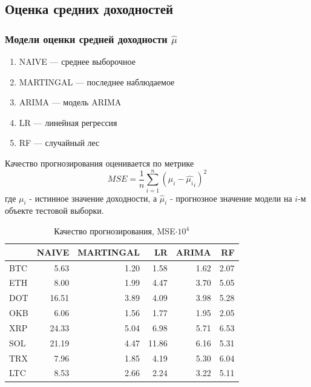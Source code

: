 \documentclass{beamer}
\begin{document}
\subsection{Оценка средних доходностей}

\begin{frame}
    \frametitle{Модели оценки средней доходности $\hat{\mu}$}
    \begin{enumerate}
        \item NAIVE --- среднее выборочное
        \item MARTINGAL --- последнее наблюдаемое
        \item ARIMA --- модель ARIMA
        \item LR --- линейная регрессия
        \item RF --- случайный лес
    \end{enumerate}

    Качество прогнозирования оценивается по метрике 
    \[
	MSE = \frac{1}{n} \sum_{i=1}^{n} (\mu_i - \hat{\mu_i}_i)^2
    \]
    где $\mu_i$ - истинное значение доходности,
    а $\hat{\mu}_i$ - прогнозное значение модели на $i$-м объекте тестовой выборки.
\end{frame}

\begin{frame}
    \begin{table}[h]
    \caption{Качество прогнозирования, MSE$\cdot 10^4$}
        \label{tab:ml_eval_metrics}
        \begin{tabular}{lrrrrr}
            \toprule
            & NAIVE & MARTINGAL & LR & ARIMA & RF \\
            \midrule
            BTC & 5.63 & 1.20 & 1.58 & 1.62 & 2.07 \\
            ETH & 8.00 & 1.99 & 4.47 & 3.70 & 5.05 \\
            DOT & 16.51 & 3.89 & 4.09 & 3.98 & 5.28 \\
            OKB & 6.06 & 1.56 & 1.77 & 1.95 & 2.05 \\
            XRP & 24.33 & 5.04 & 6.98 & 5.71 & 6.53 \\
            SOL & 21.19 & 4.47 & 11.86 & 6.16 & 5.31 \\
            TRX & 7.96 & 1.85 & 4.19 & 5.30 & 6.04 \\
            LTC & 8.53 & 2.66 & 2.24 & 3.22 & 5.11 \\
            \bottomrule
        \end{tabular}
    \end{table}
\end{frame}
\end{document}
